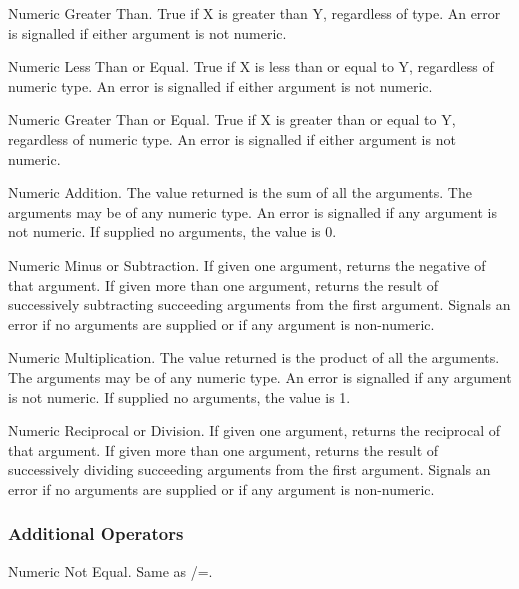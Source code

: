 {    Numeric  Greater  Than.    True  if  X  is  greater  than Y,
    regardless of  type.    An  error  is  signalled  if  either
    argument is not numeric.
}

{    Numeric Less Than or Equal.  True if X is less than or equal
    to  Y, regardless of numeric type.  An error is signalled if
    either argument is not numeric.
}

{    Numeric Greater Than or Equal.  True if X is greater than or
    equal to Y,  regardless  of  numeric  type.    An  error  is
    signalled if either argument is not numeric.
}

{    Numeric  Addition.  The value returned is the sum of all the
    arguments.  The arguments may be of any numeric  type.    An
    error  is  signalled  if  any  argument  is not numeric.  If
    supplied no arguments, the value is 0.
}

{    Numeric Minus  or  Subtraction.    If  given  one  argument,
    returns  the  negative of that argument.  If given more than
    one argument, returns the result of successively subtracting
    succeeding arguments from the first argument.    Signals  an
    error  if  no  arguments  are supplied or if any argument is
    non-numeric.
}

{    Numeric Multiplication.  The value returned is  the  product
    of  all  the arguments.  The arguments may be of any numeric
    type.  An error is signalled if any argument is not numeric.
    If supplied no arguments, the value is 1.
}

{    Numeric Reciprocal or Division.    If  given  one  argument,
    returns the reciprocal of that argument.  If given more than
    one  argument,  returns  the result of successively dividing
    succeeding arguments from the first argument.    Signals  an
    error  if  no  arguments  are supplied or if any argument is
    non-numeric.
}
\subsubsection{Additional Operators}


{    Numeric Not Equal.  Same as /=.
}

